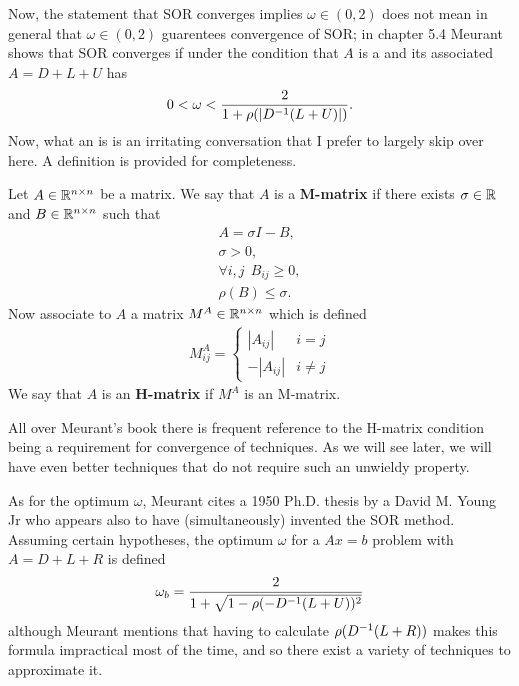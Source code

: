 \documentclass[11pt]{article}
\begin{document}
Now, the statement that SOR converges implies $\omega \in (0,2)$ does not mean in general that $\omega \in (0,2)$ guarentees convergence of SOR; in chapter 5.4 Meurant shows that SOR converges if under the condition that $A$ is a  and its associated $A = D + L + U$ has \begin{gather*}
0 < \omega < \frac{2}{1 + \rho(|D^{-1} (L + U)|)}.
\end{gather*}
Now, what an  is is an irritating conversation that I prefer to largely skip over here. A definition is provided for completeness. \begin{definition}
Let $A \in \mathbb{R}^{n \times n}$ be a matrix. We say that $A$ is a \textbf{M-matrix} if there exists $\sigma \in \mathbb{R}$ and $B \in \mathbb{R}^{n\times n}$ such that \begin{gather*}
A = \sigma I - B,\\
\sigma > 0, \\
\forall i,j \ \ B_{ij} \ge 0, \\
\rho(B) \le \sigma.
\end{gather*}
Now associate to $A$ a matrix $M^A \in \mathbb{R}^{n \times n}$ which is defined \begin{gather*}
M^A_{ij} = \left\{ \begin{matrix} |A_{ij}| & i = j \\ -|A_{ij}| & i \neq j \end{matrix} \right.
\end{gather*}
We say that $A$ is an \textbf{H-matrix} if $M^A$ is an M-matrix.
\end{definition}

All over Meurant's book there is frequent reference to the H-matrix condition being a requirement for convergence of techniques. As we will see later, we will have even better techniques that do not require such an unwieldy property.

As for the optimum $\omega$, Meurant cites a 1950 Ph.D. thesis by a David M. Young Jr who appears also to have (simultaneously) invented the SOR method. Assuming certain hypotheses, the optimum $\omega$ for a $A x = b$ problem with $A = D + L + R$ is defined \begin{gather*}
\omega_b = \frac{2}{1+\sqrt{1-\rho(-D^{-1}(L+U) )^2 }}
\end{gather*}
although Meurant mentions that having to calculate $\rho(D^{-1}(L + R))$ makes this formula impractical most of the time, and so there exist a variety of techniques to approximate it.
\end{document}
